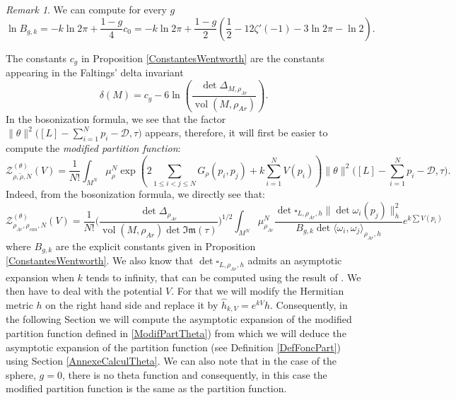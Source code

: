 \documentclass{article}
\theoremstyle{definition}
\theoremstyle{remark}
\newtheorem{Remark}[theorem]{Remark}
\DeclareMathOperator{\vol}{vol}
\begin{document}
\begin{Remark} We can compute for every $g$ 
     \begin{equation}\label{lnBgk}
         \ln B_{g,k}=-k\ln2\pi+\frac{1-g}{4}c_{0}=-k\ln2\pi +\frac{1-g}{2} \left(\frac{1}{2}-12\zeta'(-1)-3\ln2\pi-\ln2 \right).
         \end{equation}
 \end{Remark}
The constants $c_{g}$ in Proposition \ref{ConstantesWentworth} are the constants appearing in the Faltings' delta invariant \cite{FaltingsCalculusArithmeticSurface1984,PreciseWentwhorthI,JorgensonBoundsFaltings} 
\begin{equation}\label{FaltingDeltaEq}
\delta(M)=c_{g}-6\ln \left(\frac{\det\Delta_{M,\rho_{Ar}}}{\vol(M,\rho_{Ar})} \right).
\end{equation}
 In the bosonization formula, we see that the factor $\|\theta\|^{2}\big([L]-\sum_{i=1}^{N}p_{i}-\mathcal{D},\tau\big)$ appears, therefore, it will first be easier to compute the \emph{modified partition function}: \begin{equation}\label{ModifPartTheta}
\mathcal{Z}_{\rho,\tilde{\rho},N}^{(\theta)}(V)=\frac{1}{N!} \int_{M^{N}} \mu_{\rho}^{N}\exp\left(2 \sum_{1\leq i <j \leq N} G_{\rho}(p_{i},p_{j})+k\sum_{i=1}^{N} V(p_{i})\right)\|\theta\|^{2}\big([L]-\sum_{i=1}^{N}p_{i}-\mathcal{D},\tau\big).
\end{equation}
Indeed, from the bosonization formula, we directly see that: 
\begin{equation}\label{ModifPartTheta+Boso}
    \mathcal{Z}_{\rho_{Ar},\rho_{can},N}^{(\theta)}(V)=\frac{1}{N!}\bigg(\frac{\det\Delta_{\rho_{Ar}}}{\vol(M,\rho_{Ar}) \det \mathfrak{Im}(\tau)}\bigg)^{1/2}\int_{M^{N}}\mu_{\rho_{Ar}}^{N}\frac{\det\square_{L,\rho_{Ar},h} \|\det \omega_{i}(p_{j})\|^{2}_{h}}{B_{g,k}\det\langle \omega_{i},\omega_{j}\rangle_{\rho_{Ar},h}}e^{k\sum V(p_{i})}
\end{equation}
where $B_{g,k}$ are the explicit constants given in Proposition \ref{ConstantesWentworth}. We also know that $\det\square _{L,\rho_{Ar},h}$ admits an asymptotic expansion when $k$ tends to infinity, that can be computed using the result of \cite{FINSKI20183457}. We then have to deal with the potential $V.$ For that we will modify the Hermitian metric $h$ on the right hand side and replace it by $\hat{h}_{k,V}=e^{kV}h.$ Consequently, in the following Section we will compute the asymptotic expansion of the modified partition function defined in \eqref{ModifPartTheta}) from which we will deduce the asymptotic expansion of the partition function (see Definition \ref{DefFoncPart}) using Section \ref{AnnexeCalculTheta}. We can also note that in the case of the sphere, $g=0$, there is no theta function and consequently, in this case the modified partition function is the same as the partition function.
\end{document}
